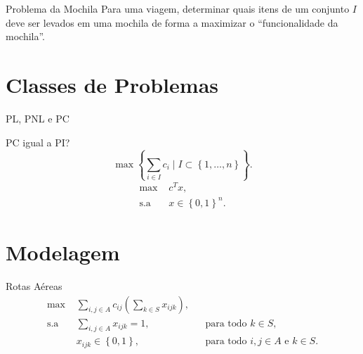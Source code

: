 \documentclass[11pt]{beamer}
\begin{document}
\begin{frame}{Problema da Mochila}
  Para uma viagem, determinar quais itens de um conjunto $I$ deve ser levados em uma
  mochila de forma a maximizar o ``funcionalidade da mochila''.
\end{frame}

\section{Classes de Problemas}
\begin{frame}{PL, PNL e PC}
  \begin{center}
  \end{center}
\end{frame}

\begin{frame}{PC igual a PI?}
  \begin{dmath}[number=PC]
    \max \left\{ \sum_{i \in I} c_i \mid I \subset \left\{ 1, \ldots, n
    \right\} \right\}.
  \end{dmath}
  \pause
  \begin{align}
    \text{max } & c^T x \tag{PI}, \\
    \text{s.a } & x \in \left\{ 0, 1 \right\}^n. \nonumber
  \end{align}
\end{frame}

\section{Modelagem}
\begin{frame}{Rotas Aéreas}
  \begin{align*}
    \text{max } & \sum_{i, j \in A} c_{ij} \left( \sum_{k \in S} x_{ijk}
    \right), \\
    \text{s.a } & \sum_{i, j \in A} x_{ijk} = 1, && \text{para todo $k \in
    S$}, \\
    & x_{ijk} \in \left\{ 0, 1 \right\}, && \text{para todo $i, j \in A$ e $k
    \in S$}.
  \end{align*}
\end{frame}
\end{document}
